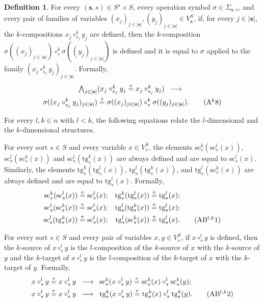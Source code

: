 \documentclass[a4paper, reqno
]{amsart}
\newcommand{\eeq}{\overset{\mathrm e}{=}}      %
\newcommand{\src}{\mathrm{sc}}
\newcommand{\tgt}{\mathrm{tg}}
\theoremstyle{plain}
\theoremstyle{definition}
\newtheorem{definition}[theorem]{Definition}
\begin{document}
\begin{definition}
For every $(\mathbf{s},s)\in S^{\star}\times S$, every operation symbol $\sigma\in \Sigma_{\mathbf{s},s}$, and every pair of families of variables $(x_{j})_{j\in \lvert\mathbf{s}\rvert}, (y_{j})_{j\in \lvert\mathbf{s}\rvert}\in V^{S}_{\mathbf{s}}$, if, for every $j\in \lvert\mathbf{s}\rvert$, the $k$-compositions $x_{j}\circ^{k}_{s_{j}}y_{j}$ are defined, then the $k$-composition $\sigma((x_{j})_{j\in \lvert\mathbf{s}\rvert})\circ^{k}_{s}\sigma((y_{j})_{j\in \lvert\mathbf{s}\rvert})$ is defined and it is equal to $\sigma$ applied to the family $(x_{j}\circ^{k}_{s_{j}}y_{j})_{j\in \lvert\mathbf{s}\rvert}$.
Formally,
\begin{multline*}
\textstyle
\bigwedge_{j\in \lvert\mathbf{s}\rvert}
(x_{j}\circ^{k}_{s_{j}} y_{j}\eeq x_{j}\circ^{k}_{s_{j}} y_{j})
\;\;\longrightarrow\;\;\\
\sigma((x_{j}\circ^{k}_{s_{j}}y_{j})_{j\in \lvert\mathbf{s}\rvert})
\eeq
\sigma((x_{j})_{j\in \lvert\mathbf{s}\rvert})\circ^{k}_{s}\sigma((y_{j})_{j\in \lvert\mathbf{s}\rvert}).
\label{ASingleSetAk8}\tag{A$^{k}$8}
\end{multline*}

For every $l,k\in n$ with $l<k$, the following equations relate the $l$-dimensional and the $k$-dimensional structures.

For every sort $s\in S$ and every variable $x\in V^{S}_{s}$, the elements $\src^{k}_{s}(\src^{l}_{s}(x))$, $\src^{l}_{s}(\src^{k}_{s}(x))$ and $\src^{l}_{s}(\tgt^{k}_{s}(x))$ are always defined and are equal to $\src^{l}_{s}(x)$.
Similarly, the elements $\tgt^{k}_{s}(\tgt^{l}_{s}(x))$, $\tgt^{l}_{s}(\tgt^{k}_{s}(x))$, and $\tgt^{l}_{s}(\src^{k}_{s}(x))$ are always defined and are equal to $\tgt^{l}_{s}(x)$.
Formally,
\begin{align*}
\src^{k}_{s}(\src^{l}_{s}(x))&\eeq\src^{l}_{s}(x);
&
\tgt^{k}_{s}(\tgt^{l}_{s}(x))&\eeq\tgt^{l}_{s}(x);\\
\src^{l}_{s}(\src^{k}_{s}(x))&\eeq\src^{l}_{s}(x);
&
\tgt^{l}_{s}(\tgt^{k}_{s}(x))&\eeq\tgt^{l}_{s}(x);\\
\src^{l}_{s}(\tgt^{k}_{s}(x))&\eeq\src^{l}_{s}(x);
&
\tgt^{l}_{s}(\src^{k}_{s}(x))&\eeq\tgt^{l}_{s}(x).\label{ASingleSetABlk1}\tag{AB$^{l,k}$1}
\end{align*}

For every sort $s\in S$ and every pair of variables $x,y\in V^{S}_{s}$, if $x\circ^{l}_{s}y$ is defined, then the $k$-source of $x\circ^{l}_{s}y$ is the $l$-composition of the $k$-source of $x$ with the $k$-source of $y$ and the $k$-target of $x\circ^{l}_{s}y$ is the $l$-composition of the $k$-target of $x$ with the $k$-target of $y$.
Formally,
\begin{align*}
x\circ^{l}_{s}y&\eeq x\circ^{l}_{s}y \;\;\longrightarrow\;\;
\src^{k}_{s}(x\circ^{l}_{s}y)\eeq\src^{k}_{s}(x)\circ^{l}_{s}\src^{k}_{s}(y);\\
x\circ^{l}_{s}y&\eeq x\circ^{l}_{s}y \;\;\longrightarrow\;\;
\tgt^{k}_{s}(x\circ^{l}_{s}y)\eeq\tgt^{k}_{s}(x)\circ^{l}_{s}\tgt^{k}_{s}(y).
\label{ASingleSetABlk2}\tag{AB$^{l,k}$2}
\end{align*}


\end{definition}
\end{document}
